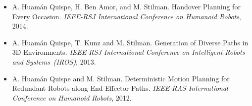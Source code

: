 \documentclass[margin]{res}
\begin{document}
\begin{resume}
\begin{itemize}
                    \item A. Huam\'{a}n Quispe, H. Ben Amor, and M. Stilman. Handover Planning for Every Occasion. {\em IEEE-RSJ International Conference on Humanoid Robots}, 2014.
                    
                    \item A. Huam\'{a}n Quispe, T. Kunz and M. Stilman. Generation of Diverse Paths in 3D Environments. {\em IEEE-RSJ International Conference on Intelligent Robots and Systems~(IROS)}, 2013.
                      
                    \item A. Huam\'{a}n Quispe and M. Stilman. Deterministic Motion Planning for Redundant Robots along End-Effector Paths. {\em IEEE-RAS International Conference on Humanoid Robots}, 2012.
                    \end{itemize}



\end{resume}
\end{document}
